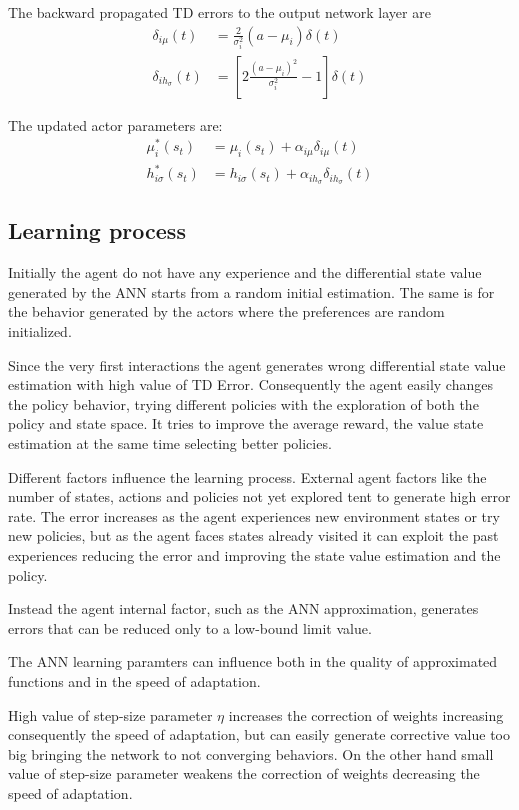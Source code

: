 \documentclass[]{article}
\begin{document}
The backward propagated TD errors to the output network layer are
\begin{align}
\delta_{i\mu}(t)&		= \frac{2}{\sigma_i^2}(a - \mu_i) \delta (t)
\\
\delta_{ih_\sigma}(t)&	= \left[
2\frac{(a - \mu_i)^2}{\sigma_i^2} - 1
\right] \delta(t)
\end{align}

The updated actor parameters are:
\begin{align}
	\mu_i^*(s_t)&			= \mu_i(s_t) + \alpha_{i\mu} \delta_{i\mu}(t)
	\\
	h^*_{i\sigma}(s_t)&	= h_{i\sigma}(s_t) + \alpha_{ih_\sigma} \delta_{ih_\sigma}(t)
\end{align}

\subsection{Learning process}

Initially the agent do not have any experience and the differential state value generated by the ANN starts from a random initial estimation. The same is for the behavior generated by the actors where the preferences are random initialized.

Since the very first interactions the agent generates wrong differential state value estimation with high value of TD Error. Consequently the agent easily changes the policy behavior, trying different policies with the exploration of both the policy and state space. It tries to improve the average reward, the value state estimation at the same time selecting better policies.

Different factors influence the learning process.
External agent factors like the number of states, actions and policies not yet explored tent to generate high error rate.
The error increases as the agent experiences new environment states or try new policies, but as the agent faces states already visited it can exploit the past experiences reducing the error and improving the state value estimation and the policy.

Instead the agent internal factor, such as the ANN approximation, generates errors that can be reduced only to a low-bound limit value.

The ANN learning paramters can influence both in the quality of approximated functions and in the  speed of adaptation.

High value of step-size parameter $ \eta $ increases the correction of weights increasing consequently the speed of adaptation, but can easily generate corrective value too big bringing the network to not converging behaviors.
On the other hand small value of step-size parameter weakens the correction of weights decreasing the speed of adaptation.
\end{document}
